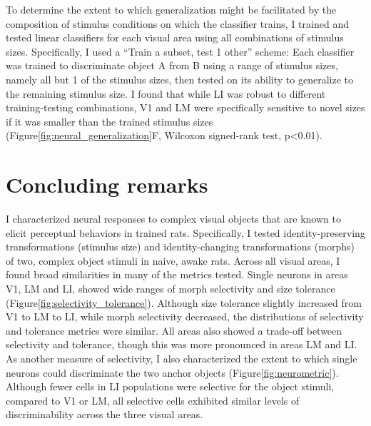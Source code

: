 To determine the extent to which generalization might be facilitated by the composition of stimulus conditions on which the classifier trains, I trained and tested linear classifiers for each visual area using all combinations of stimulus sizes. Specifically, I used a ``Train a subset, test 1 other'' scheme:  Each classifier was trained to discriminate object A from B using a range of stimulus sizes, namely all but 1 of the stimulus sizes, then tested on its ability to generalize to the remaining stimulus size. I found that while LI was robust to different training-testing combinations, V1 and LM were specifically sensitive to novel sizes if it was smaller than the trained stimulus sizes (Figure\ref{fig:neural_generalization}F, Wilcoxon signed-rank test, p<0.01). 


\section{Concluding remarks}
I characterized neural responses to complex visual objects that are known to elicit perceptual behaviors in trained rats. Specifically, I tested identity-preserving transformations (stimulus size) and identity-changing transformations (morphs) of two, complex object stimuli in naive, awake rats. Across all visual areas, I found broad similarities in many of the metrics tested. Single neurons in areas V1, LM and LI, showed wide ranges of morph selectivity and size tolerance (Figure\ref{fig:selectivity_tolerance}). Although size tolerance slightly increased from V1 to LM to LI, while morph selectivity decreased, the distributions of selectivity and tolerance metrics were similar. All areas also showed a trade-off between selectivity and tolerance, though this was more pronounced in areas LM and LI. As another measure of selectivity, I also characterized the extent to which single neurons could discriminate the two anchor objects (Figure\ref{fig:neurometric}). Although fewer cells in LI populations were selective for the object stimuli, compared to V1 or LM, all selective cells exhibited similar levels of discriminability across the three visual areas. 

